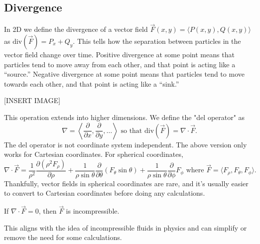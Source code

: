 \subsection{Divergence}
\noindent
In 2D we define the divergence of a vector field $\vec{F}(x,y) = \langle P(x,y), Q(x,y) \rangle$ as $\text{div}(\vec{F}) = P_x+Q_y$. This tells how the separation between particles in the vector field change over time. Positive divergence at some point means that particles tend to move away from each other, and that point is acting like a “source.” Negative divergence at some point means that particles tend to move towards each other, and that point is acting like a “sink.”

[INSERT IMAGE]

\noindent
This operation extends into higher dimensions. We define the "del operator" as
\begin{equation*}
	\nabla = \left< \frac{\partial}{\partial x}, \frac{\partial}{\partial y},\ldots\right> \text{ so that } \text{div}(\vec{F}) = \nabla \cdot \vec{F}.
\end{equation*}
The del operator is not coordinate system independent. The above version only works for Cartesian coordinates. For spherical coordinates,
\begin{equation*}
	\nabla \cdot \vec{F} = \frac{1}{\rho^2}\frac{\partial(\rho^2 F_\rho)}{\partial\rho} + \frac{1}{\rho\sin{\theta}}\frac{\partial}{\partial\theta}(F_\theta \sin{\theta}) + \frac{1}{\rho\sin{\theta}}\frac{\partial}{\partial\phi}F_\phi  \text{ where } \vec{F} = \langle F_\rho, F_\theta, F_\phi \rangle.
\end{equation*}
Thankfully, vector fields in spherical coordinates are rare, and it's usually easier to convert to Cartesian coordinates before doing any calculations.\\

\begin{definition}
	If $\nabla \cdot \vec{F} = 0$, then $\vec{F}$ is incompressible.
\end{definition}
\noindent
This aligns with the idea of incompressible fluids in physics and can simplify or remove the need for some calculations.

